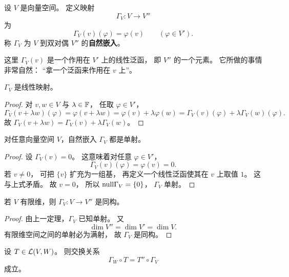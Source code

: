 \begin{definition} 设 $V$ 是向量空间。 定义映射 \[ \Gamma_V:V\to V'' \] 为 \[ \Gamma_V(v)(\varphi)=\varphi(v)\qquad (\varphi\in V'). \] 称 $\Gamma_V$ 为 $V$ 到双对偶 $V''$ 的\textbf{自然嵌入}。 \end{definition} 这里 $\Gamma_V(v)$ 是一个作用在 $V'$ 上的线性泛函， 即 $V''$ 的一个元素。 它所做的事情非常自然： “拿一个泛函来作用在 $v$ 上”。




\begin{proposition} $\Gamma_V$ 是线性映射。 \end{proposition}




\begin{proof} 对 $v,w\in V$ 与 $\lambda\in\mathbb{F}$， 任取 $\varphi\in V'$， \[ \Gamma_V(v+\lambda w)(\varphi)=\varphi(v+\lambda w)=\varphi(v)+\lambda\varphi(w) =\Gamma_V(v)(\varphi)+\lambda\Gamma_V(w)(\varphi). \] 故 $\Gamma_V(v+\lambda w)=\Gamma_V(v)+\lambda\Gamma_V(w)$。 \end{proof}




\begin{theorem} 对任意向量空间 $V$，自然嵌入 $\Gamma_V$ 都是单射。 \end{theorem}




\begin{proof} 设 $\Gamma_V(v)=0$。 这意味着对任意 $\varphi\in V'$， \[ \Gamma_V(v)(\varphi)=\varphi(v)=0. \] 若 $v\neq 0$， 可把 $\{v\}$ 扩充为一组基， 再定义一个线性泛函使其在 $v$ 上取值 $1$。 这与上式矛盾。 故 $v=0$， 所以 $\mathrm{null} \Gamma_V=\{0\}$， $\Gamma_V$ 单射。 \end{proof}




\begin{theorem} 若 $V$ 有限维，则 $\Gamma_V:V\to V''$ 是同构。 \end{theorem}




\begin{proof} 由上一定理，$\Gamma_V$ 已知单射。 又 \[ \dim V''=\dim V'=\dim V. \] 有限维空间之间的单射必为满射， 故 $\Gamma_V$ 是同构。 \end{proof}




\begin{proposition} 设 $T\in\mathcal{L}(V,W)$。 则交换关系 \[ \Gamma_W\circ T=T''\circ \Gamma_V \] 成立。 \end{proposition}




